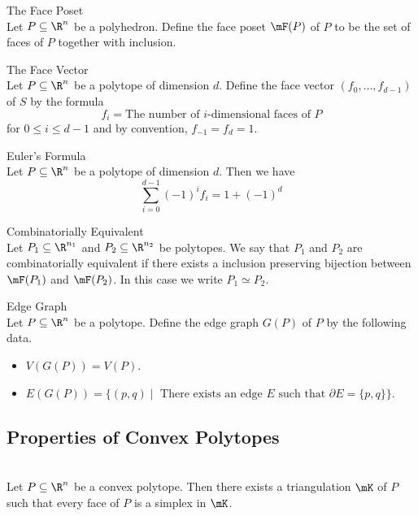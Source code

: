\documentclass[a4paper]{article}
\begin{document}
\begin{defn}{The Face Poset}{}\\
Let $P\subseteq\R^n$ be a polyhedron. Define the face poset $\mF(P)$ of $P$ to be the set of faces of $P$ together with inclusion. 
\end{defn}

\begin{defn}{The Face Vector}{}\\
Let $P\subseteq\R^n$ be a polytope of dimension $d$. Define the face vector $(f_0,\dots,f_{d-1})$ of $S$ by the formula $$f_i=\text{The number of }i\text{-dimensional faces of }P$$ for $0\leq i\leq d-1$ and by convention, $f_{-1}=f_d=1$. 
\end{defn}

\begin{lmm}{Euler's Formula}{}\\
Let $P\subseteq\R^n$ be a polytope of dimension $d$. Then we have $$\sum_{i=0}^{d-1}(-1)^if_i=1+(-1)^d$$
\end{lmm}

\begin{defn}{Combinatorially Equivalent}{}\\
Let $P_1\subseteq\R^{n_1}$ and $P_2\subseteq\R^{n_2}$ be polytopes. We say that $P_1$ and $P_2$ are combinatorially equivalent if there exists a inclusion preserving bijection between $\mF(P_1)$ and $\mF(P_2)$. In this case we write $P_1\simeq P_2$. 
\end{defn}

\begin{defn}{Edge Graph}{}\\
Let $P\subseteq\R^n$ be a polytope. Define the edge graph $G(P)$ of $P$ by the following data. 
\begin{itemize}
\item $V(G(P))=V(P)$. 
\item $E(G(P))=\{(p,q)\;|\;\text{ There exists an edge }E\text{ such that }\partial E=\{p,q\}\}$. 
\end{itemize}
\end{defn}

\subsection{Properties of Convex Polytopes}
\begin{prp}{}{}\\
Let $P\subseteq\R^n$ be a convex polytope. Then there exists a triangulation $\mK$ of $P$ such that every face of $P$ is a simplex in $\mK$. 
\end{prp}
\end{document}
